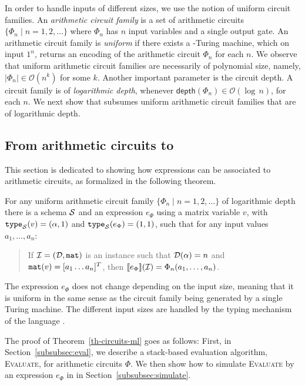 In order to handle inputs of different sizes, we use the notion of uniform circuit families. An \textit{arithmetic circuit family} is a set of arithmetic circuits $\{\Phi_n\mid n=1,2,\ldots\}$ where $\Phi_n$ has $n$ input variables and a single output gate. An arithmetic circuit family is \textit{uniform} if there exists a \logspace-Turing machine,
which on input $1^n$, returns an encoding of the arithmetic circuit $\Phi_n$ for each $n$.
We observe that uniform arithmetic circuit families are necessarily of polynomial size, namely, $|\Phi_n| \in \mathcal{O}(n^k)$ for some $k$.
Another important parameter is the circuit depth. A circuit family is of \textit{logarithmic depth}, whenever $\mathsf{depth}(\Phi_n)\in \mathcal{O}(\log\, n)$, for each $n$. We next show that \langfor subsumes uniform arithmetic circuit families that are of logarithmic depth. 


\subsection{From arithmetic circuits to \langfor}\label{subsec:actoformatlang}
This section is dedicated to showing how \langfor expressions can be associated to arithmetic circuits, as formalized
in the following theorem.

\begin{theorem}
\label{th-circuits-ml}
For any uniform arithmetic circuit family $\{\Phi_n\mid n=1,2,\ldots\}$ of logarithmic depth there is a \langfor schema $\mathcal{S}$ and an expression $e_\Phi$ using a matrix variable $v$, with $\texttt{type}_{\mathcal{S}}(v)=(\alpha,1)$ and $\texttt{type}_{\mathcal{S}}(e_\Phi) = (1,1)$, such that for any input values $a_1,\ldots ,a_n$: 
\begin{quote} If $\mathcal{I} = (\mathcal{D},\texttt{mat})$ is an instance such that $\mathcal{D}(\alpha) = n$ and $\texttt{mat}(v) = [a_1 \ldots a_n]^T$,
 then $\llbracket e_\Phi \rrbracket(\mathcal{I}) = \Phi_n(a_1,\ldots ,a_n)$.
\end{quote}
\end{theorem}
The expression $e_\Phi$ does not change depending on the input size, meaning that it is uniform in the same sense as the circuit family being generated by a single Turing machine. The different input sizes are handled by the typing mechanism of the language \langfor. 

The proof of Theorem~\ref{th-circuits-ml} goes as follows: First, in
Section~\ref{subsubsec:eval}, we describe a stack-based evaluation algorithm, \textsc{Evaluate}, for arithmetic circuits $\Phi$. We then show how to simulate  \textsc{Evaluate} by an expression $e_\Phi$ in \langfor in Section~\ref{subsubsec:simulate}. 

